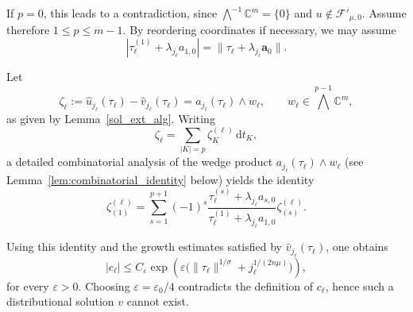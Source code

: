 \documentclass[12pt,reqno]{amsart}
\theoremstyle{definition}
\numberwithin{equation}{section}
\begin{document}
If $p=0$, this leads to a contradiction, since $\textstyle\bigwedge^{-1} \mathbb{C}^m=\{0\}$ and
$u\notin\mathscr{F}'_{\mu,0}$.
Assume therefore $1\le p\le m-1$.
By reordering coordinates if necessary, we may assume
\[
|\tau_\ell^{(1)}+\lambda_{j_\ell}a_{1,0}|
= \|\tau_\ell+\lambda_{j_\ell}\boldsymbol{a}_0\|.
\]

Let
\[
\zeta_\ell :=
\widehat u_{j_\ell}(\tau_\ell)-\widehat v_{j_\ell}(\tau_\ell)
= a_{j_\ell}(\tau_\ell)\wedge w_\ell,
\qquad
w_\ell\in\textstyle\bigwedge^{p-1}\mathbb C^m,
\]
as given by Lemma~\ref{sol_ext_alg}.
Writing
\[
\zeta_\ell=\sum_{|K|=p}\zeta_K^{(\ell)}\,\mathrm dt_K,
\]
a detailed combinatorial analysis of the wedge product
$a_{j_\ell}(\tau_\ell)\wedge w_\ell$
(see Lemma~\ref{lem:combinatorial_identity} below)
yields the identity
\begin{equation}\label{zeta_1}
	\zeta_{(1)}^{(\ell)}
	=
	\sum_{s=1}^{p+1}
	(-1)^s
	\frac{\tau_\ell^{(s)}+\lambda_{j_\ell}a_{s,0}}
	{\tau_\ell^{(1)}+\lambda_{j_\ell}a_{1,0}}
	\zeta_{(s)}^{(\ell)}.
\end{equation}

Using this identity and the growth estimates satisfied by
$\widehat v_{j_\ell}(\tau_\ell)$, one obtains
\[
|c_\ell|
\le
C_\varepsilon
\exp\!\left(
\varepsilon\bigl(\|\tau_\ell\|^{1/\sigma}+j_\ell^{1/(2n\mu)}\bigr)
\right),
\]
for every $\varepsilon>0$.
Choosing $\varepsilon=\varepsilon_0/4$ contradicts the definition of $c_\ell$,
hence such a distributional solution $v$ cannot exist.
\end{document}
